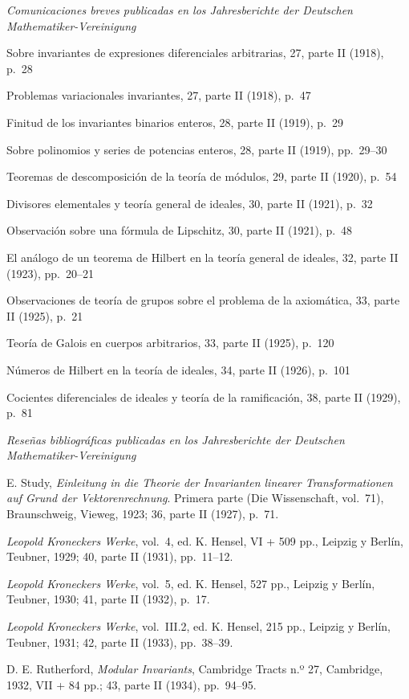 \begin{center}\emph{Comunicaciones breves publicadas en los Jahresberichte der Deutschen Mathematiker-Vereinigung}\end{center}
\begingroup\setlength{\parindent}{0pt}\setlength{\parskip}{0.15em}
Sobre invariantes de expresiones diferenciales arbitrarias, 27, parte II (1918), p.~28\par
Problemas variacionales invariantes, 27, parte II (1918), p.~47\par
Finitud de los invariantes binarios enteros, 28, parte II (1919), p.~29\par
Sobre polinomios y series de potencias enteros, 28, parte II (1919), pp.~29--30\par
Teoremas de descomposición de la teoría de módulos, 29, parte II (1920), p.~54\par
Divisores elementales y teoría general de ideales, 30, parte II (1921), p.~32\par
Observación sobre una fórmula de Lipschitz, 30, parte II (1921), p.~48\par
El análogo de un teorema de Hilbert en la teoría general de ideales, 32, parte II (1923), pp.~20--21\par
Observaciones de teoría de grupos sobre el problema de la axiomática, 33, parte II (1925), p.~21\par
Teoría de Galois en cuerpos arbitrarios, 33, parte II (1925), p.~120\par
Números de Hilbert en la teoría de ideales, 34, parte II (1926), p.~101\par
Cocientes diferenciales de ideales y teoría de la ramificación, 38, parte II (1929), p.~81\par
\endgroup

\begin{center}\emph{Reseñas bibliográficas publicadas en los Jahresberichte der Deutschen Mathematiker-Vereinigung}\end{center}
\begingroup\setlength{\parindent}{0pt}\setlength{\parskip}{0.35em}
E. Study, \emph{Einleitung in die Theorie der Invarianten linearer Transformationen auf Grund der Vektorenrechnung}. Primera parte (Die Wissenschaft, vol.~71), Braunschweig, Vieweg, 1923; 36, parte II (1927), p.~71.\par
\emph{Leopold Kroneckers Werke}, vol.~4, ed. K. Hensel, VI + 509 pp., Leipzig y Berlín, Teubner, 1929; 40, parte II (1931), pp.~11--12.\par
\emph{Leopold Kroneckers Werke}, vol.~5, ed. K. Hensel, 527 pp., Leipzig y Berlín, Teubner, 1930; 41, parte II (1932), p.~17.\par
\emph{Leopold Kroneckers Werke}, vol.~III.2, ed. K. Hensel, 215 pp., Leipzig y Berlín, Teubner, 1931; 42, parte II (1933), pp.~38--39.\par
D. E. Rutherford, \emph{Modular Invariants}, Cambridge Tracts n.º 27, Cambridge, 1932, VII + 84 pp.; 43, parte II (1934), pp.~94--95.\par
\endgroup

